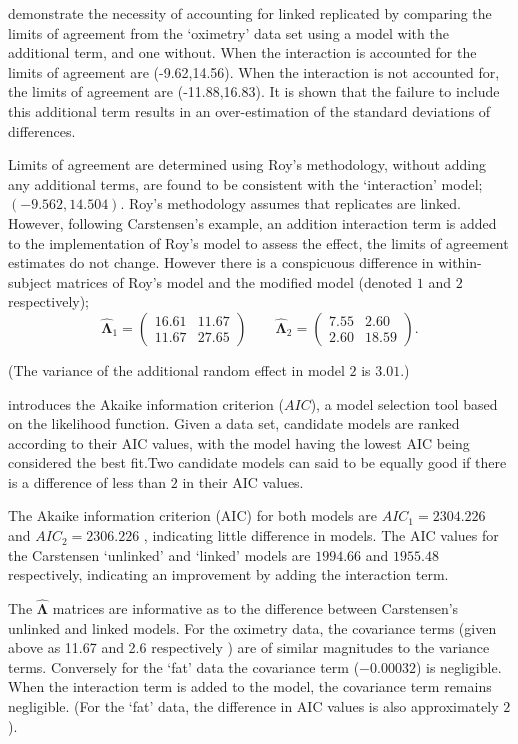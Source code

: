 \documentclass[12pt, a4paper]{report}
\theoremstyle{plain}
\theoremstyle{definition}
\theoremstyle{remark}
\begin{document}
\citet{BXC2008} demonstrate the necessity of accounting for linked replicated by comparing the limits of agreement from the `oximetry' data set using a model with the additional term, and one without. When the interaction is accounted for the limits of agreement are (-9.62,14.56). When the interaction is not accounted for, the limits of agreement are (-11.88,16.83). It is shown that the failure to include this additional term results in an over-estimation of the standard deviations of differences.

Limits of agreement are determined using Roy's methodology, without adding any additional terms, are found to be consistent with the `interaction' model; $(-9.562, 14.504 )$. Roy's methodology assumes that replicates are linked. However, following Carstensen's example, an addition interaction term is added to the implementation of Roy's model to assess the effect, the limits of agreement estimates do not change. However there is a conspicuous difference in within-subject matrices of Roy's model and the modified model (denoted $1$ and $2$ respectively);
\begin{equation}
\hat{\boldsymbol{\Lambda}}_{1}= \begin{pmatrix}
	16.61 &	11.67\\
	11.67 & 27.65 
	\end{pmatrix}\qquad
\boldsymbol{\hat{\Lambda}}_{2}= \begin{pmatrix}
	7.55 & 2.60 \\
	2.60 & 18.59
		\end{pmatrix}.
\end{equation}

\noindent (The variance of the additional random effect in model $2$ is $3.01$.)

\citet{akaike} introduces the Akaike information criterion ($AIC$), a model
selection tool based on the likelihood function. Given a data set, candidate models
are ranked according to their AIC values, with the model having the lowest AIC being considered the best fit.Two candidate models can said to be equally good if there is a difference of less than $2$ in their AIC values.

The Akaike information criterion (AIC) for both models are $AIC_{1} = 2304.226$ and $AIC_{2} = 2306.226$ , indicating little difference in models. The AIC values for the Carstensen `unlinked' and `linked' models are $1994.66$ and $1955.48$ respectively, indicating an improvement by adding the interaction term.

The $\boldsymbol{\hat{\Lambda}}$ matrices are informative as to the difference between Carstensen's unlinked and linked models. For the oximetry data, the covariance terms (given above as 11.67 and 2.6 respectively ) are of similar magnitudes to the variance terms. Conversely for the `fat' data the covariance term ($-0.00032$) is negligible. When the interaction term is added to the model, the covariance term remains negligible. (For the `fat' data, the difference in AIC values is also approximately $2$).
\end{document}
